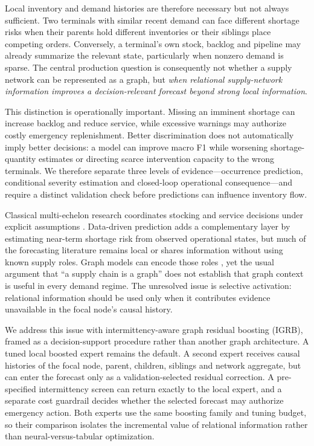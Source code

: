 \documentclass[11pt,a4paper]{article}
\begin{document}
Local inventory and demand histories are therefore necessary but not always sufficient. Two terminals with similar recent demand can face different shortage risks when their parents hold different inventories or their siblings place competing orders. Conversely, a terminal's own stock, backlog and pipeline may already summarize the relevant state, particularly when nonzero demand is sparse. The central production question is consequently not whether a supply network can be represented as a graph, but \emph{when relational supply-network information improves a decision-relevant forecast beyond strong local information}.

This distinction is operationally important. Missing an imminent shortage can increase backlog and reduce service, while excessive warnings may authorize costly emergency replenishment. Better discrimination does not automatically imply better decisions: a model can improve macro F1 while worsening shortage-quantity estimates or directing scarce intervention capacity to the wrong terminals. We therefore separate three levels of evidence---occurrence prediction, conditional severity estimation and closed-loop operational consequence---and require a distinct validation check before predictions can influence inventory flow.

Classical multi-echelon research coordinates stocking and service decisions under explicit assumptions \cite{clark,graves}. Data-driven prediction adds a complementary layer by estimating near-term shortage risk from observed operational states, but much of the forecasting literature remains local or shares information without using known supply roles. Graph models can encode those roles \cite{gcn,rgcn,gat,chang,kotecha}, yet the usual argument that ``a supply chain is a graph'' does not establish that graph context is useful in every demand regime. The unresolved issue is selective activation: relational information should be used only when it contributes evidence unavailable in the focal node's causal history.

We address this issue with intermittency-aware graph residual boosting (IGRB), framed as a decision-support procedure rather than another graph architecture. A tuned local boosted expert remains the default. A second expert receives causal histories of the focal node, parent, children, siblings and network aggregate, but can enter the forecast only as a validation-selected residual correction. A pre-specified intermittency screen can return exactly to the local expert, and a separate cost guardrail decides whether the selected forecast may authorize emergency action. Both experts use the same boosting family and tuning budget, so their comparison isolates the incremental value of relational information rather than neural-versus-tabular optimization.
\end{document}
